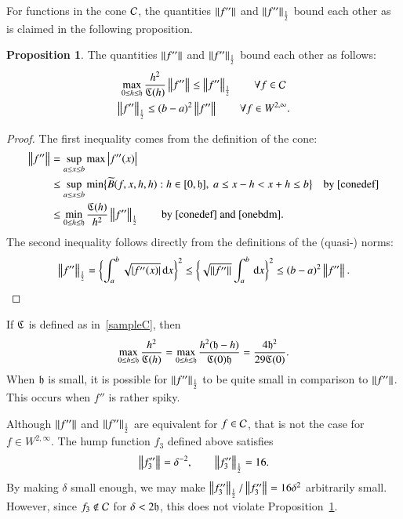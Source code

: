 \documentclass[review]{elsarticle}
\theoremstyle{definition}
\renewcommand{\cw}{W}
\newtheorem{prop}[theorem]{Proposition}
\begin{document}
For functions in the cone $\cc$, the quantities $\norm{f''}$ and $\norm[\frac 12]{f''}$ bound each other as is claimed in the following proposition.

\begin{prop} \label{equivnormprop} The quantities $\norm{f''}$ and $\norm[\frac 12]{f''}$ bound each other as follows:
	\begin{subequations}
		\begin{gather}
		\label{inflesshalf}
		\max_{0 \le h \le \fh} \frac{h^2}{\fC(h)} \norm{f''} \le \norm[\frac 12]{f''} \qquad \forall f \in \cc \\
		\label{halflessinf}
		\norm[\frac 12]{f''}  \le (b-a)^2 \norm{f''} \qquad \forall f \in \cw^{2,\infty}.
		\end{gather}
	\end{subequations}
\end{prop}
\begin{proof}
The first inequality comes from the definition of the cone:
\begin{align*}
\norm{f''} & = \sup_{a \le x \le b} \max \abs{f''(x)} \\
& \le \sup_{a \le x \le b} \min\bigl\{\tB(f,x,h,h) : h \in [0,\fh], \ a \le x - h < x+h \le b \bigr \} \quad \text{by}~\eqref{conedef} \\
& \le \min_{0 \le h \le \fh} \frac{\fC(h)}{h^2}\norm[\frac 12]{f''} \qquad \text{by}~\eqref{conedef} \text{ and}~\eqref{onebdm}.
\end{align*}
The second inequality follows directly from the definitions of the (quasi-) norms:
\begin{equation} \label{onebdm}
\norm[\frac 12]{f''} = \biggl\{ \int_{a}^{b} \sqrt{\abs{f''(x)}} \, \dif x \biggr\}^2 \le\biggl\{\sqrt{\norm{f''}}  \int_{a}^{b} \, \dif x \biggr\}^2 \le  (b - a)^2 \norm{f''}.
\end{equation}
\end{proof}

If $\fC$ is defined as in~\eqref{sampleC}, then
\[
\max_{0 \le h \le \fh} \frac{h^2}{\fC(h)} = \max_{0 \le h \le \fh} \frac{h^2(\fh - h)}{\fC(0)\fh} = \frac{4\fh^2}{29\fC(0)}.
\]
When $\fh$ is small, it is possible for $\norm[\frac 12]{f''} $ to be quite small in comparison to $\norm{f''}$.  This occurs when $f''$ is rather spiky.


Although $\norm{f''}$ and $\norm[\frac 12]{f''} $ are equivalent for $f \in \cc$, that is not the case for $f \in \cw^{2,\infty}$.  The hump function $f_3$ defined above satisfies
\[
\norm{f_3''} = \delta^{-2}, \qquad \norm[\frac 12]{f_3''}  = 16.
\]
By making $\delta$ small enough, we may make $\norm[\frac 12]{f_3''}/\norm{f_3''} = 16\delta^2$ arbitrarily small.  However, since $f_3 \notin \cc$ for $\delta < 2\fh$, this does not violate Proposition~\ref{equivnormprop}.
\end{document}

